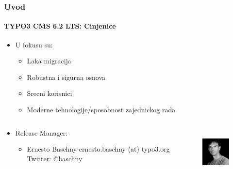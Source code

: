 \begin{frame}[fragile]
	\frametitle{Uvod}
	\framesubtitle{TYPO3 CMS 6.2 LTS: Cinjenice}

	\begin{itemize}
		\item U fokusu su:

			\begin{itemize}
				\item Laka migracija
				\item Robustna i sigurna osnova
				\item Srecni korisnici
				\item Moderne tehnologije/sposobnost zajednickog rada
			\end{itemize}

	\end{itemize}

	\begin{columns}[T]

		\begin{column}{.5\textwidth}
			\begin{itemize}
				\item Release Manager:
				\begin{itemize}
					\item Ernesto Baschny\newline
						ernesto.baschny (at) typo3.org\newline
						Twitter: @baschny
				\end{itemize}
			\end{itemize}
		\end{column}

		\begin{column}{.5\textwidth}
			\begin{figure}
				\includegraphics[width=2.6cm,height=2.6cm]{Images/Introduction/ErnestoBaschny.jpg}
			\end{figure}
		\end{column}

	\end{columns}

\end{frame}



